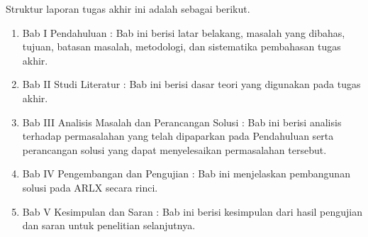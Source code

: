 Struktur laporan tugas akhir ini adalah sebagai berikut.

\begin{enumerate}

    \item Bab I Pendahuluan : Bab ini berisi latar belakang, masalah yang dibahas, tujuan,
    	    batasan masalah, metodologi, dan sistematika pembahasan tugas akhir.

    \item Bab II Studi Literatur : Bab ini berisi dasar teori yang digunakan pada tugas akhir.

    \item Bab III Analisis Masalah dan Perancangan Solusi : Bab ini berisi analisis terhadap
    	    permasalahan yang telah dipaparkan pada Pendahuluan serta perancangan solusi yang
    	    dapat menyelesaikan permasalahan tersebut.

    \item Bab IV Pengembangan dan Pengujian : Bab ini menjelaskan pembangunan solusi pada ARLX
    	    secara rinci.

    \item Bab V Kesimpulan dan Saran : Bab ini berisi kesimpulan dari hasil pengujian dan saran
    	    untuk penelitian selanjutnya.

\end{enumerate}

